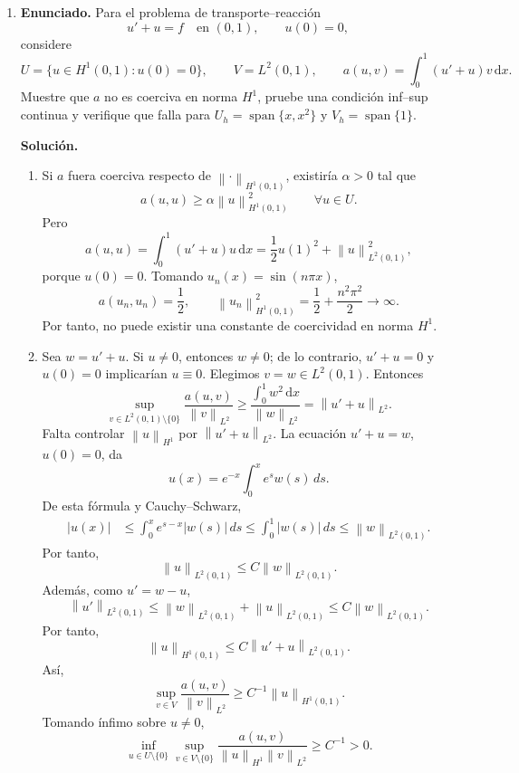 \documentclass[11pt]{article}
\newcommand{\norm}[1]{\left\lVert #1\right\rVert}
\def\dx{\mbox{\(\,\mathrm{d}x\)}}
\begin{document}
\begin{enumerate}[label=\textbf{\arabic*.}, leftmargin=*]
    \item \textbf{Enunciado.} Para el problema de transporte--reacción
    \[
        u'+u=f\quad\text{en }(0,1),\qquad u(0)=0,
    \]
    considere
    \[
        U=\{u\in H^1(0,1):u(0)=0\},\qquad
        V=L^2(0,1),\qquad
        a(u,v)=\int_0^1(u'+u)v\dx.
    \]
    Muestre que $a$ no es coerciva en norma $H^1$, pruebe una condición inf--sup continua y verifique que falla para $U_h=\operatorname{span}\{x,x^2\}$ y $V_h=\operatorname{span}\{1\}$.

    \textbf{Solución.}
    \begin{enumerate}[label=(\alph*)]
        \item Si $a$ fuera coerciva respecto de $\norm{\cdot}_{H^1(0,1)}$, existiría $\alpha>0$ tal que
        \[
            a(u,u)\ge\alpha\norm{u}_{H^1(0,1)}^2
            \qquad\forall u\in U.
        \]
        Pero
        \[
            a(u,u)=\int_0^1(u'+u)u\dx
            =
            \frac12u(1)^2+\norm{u}_{L^2(0,1)}^2,
        \]
        porque $u(0)=0$. Tomando $u_n(x)=\sin(n\pi x)$,
        \[
            a(u_n,u_n)=\frac12,
            \qquad
            \norm{u_n}_{H^1(0,1)}^2
            =
            \frac12+\frac{n^2\pi^2}{2}\to\infty.
        \]
        Por tanto, no puede existir una constante de coercividad en norma $H^1$.

        \item Sea $w=u'+u$. Si $u\neq0$, entonces $w\neq0$; de lo contrario, $u'+u=0$ y $u(0)=0$ implicarían $u\equiv0$. Elegimos $v=w\in L^2(0,1)$. Entonces
        \[
            \sup_{v\in L^2(0,1)\setminus\{0\}}
            \frac{a(u,v)}{\norm{v}_{L^2}}
            \ge
            \frac{\int_0^1w^2\dx}{\norm{w}_{L^2}}
            =
            \norm{u'+u}_{L^2}.
        \]
        Falta controlar $\norm{u}_{H^1}$ por $\norm{u'+u}_{L^2}$. La ecuación $u'+u=w$, $u(0)=0$, da
        \[
            u(x)=e^{-x}\int_0^x e^s w(s)\,ds.
        \]
        De esta fórmula y Cauchy--Schwarz,
        \[
        \begin{aligned}
            |u(x)|
            &\le
            \int_0^x e^{s-x}|w(s)|\,ds
            \le
            \int_0^1 |w(s)|\,ds
            \le
            \norm{w}_{L^2(0,1)}.
        \end{aligned}
        \]
        Por tanto,
        \[
            \norm{u}_{L^2(0,1)}
            \le
            C\norm{w}_{L^2(0,1)}.
        \]
        Además, como $u'=w-u$,
        \[
            \norm{u'}_{L^2(0,1)}
            \le
            \norm{w}_{L^2(0,1)}
            +\norm{u}_{L^2(0,1)}
            \le
            C\norm{w}_{L^2(0,1)}.
        \]
        Por tanto,
        \[
            \norm{u}_{H^1(0,1)}\le C\norm{u'+u}_{L^2(0,1)}.
        \]
        Así,
        \[
            \sup_{v\in V}
            \frac{a(u,v)}{\norm{v}_{L^2}}
            \ge
            C^{-1}\norm{u}_{H^1(0,1)}.
        \]
        Tomando ínfimo sobre $u\neq0$,
        \[
            \inf_{u\in U\setminus\{0\}}
            \sup_{v\in V\setminus\{0\}}
            \frac{a(u,v)}{\norm{u}_{H^1}\norm{v}_{L^2}}
            \ge C^{-1}>0.
        \]


\end{enumerate}
\end{enumerate}
\end{document}
